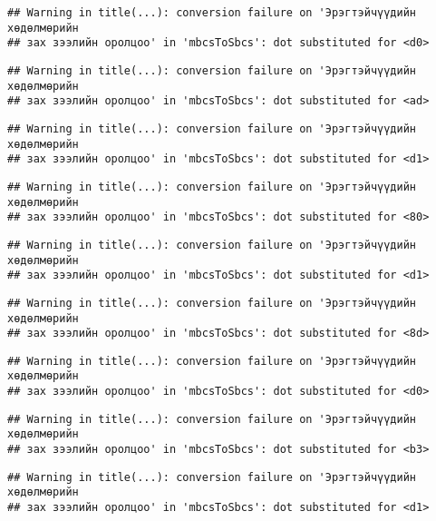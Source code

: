 \documentclass[]{article}
\begin{document}
\begin{verbatim}
## Warning in title(...): conversion failure on 'Эрэгтэйчүүдийн хөдөлмөрийн
## зах зээлийн оролцоо' in 'mbcsToSbcs': dot substituted for <d0>
\end{verbatim}

\begin{verbatim}
## Warning in title(...): conversion failure on 'Эрэгтэйчүүдийн хөдөлмөрийн
## зах зээлийн оролцоо' in 'mbcsToSbcs': dot substituted for <ad>
\end{verbatim}

\begin{verbatim}
## Warning in title(...): conversion failure on 'Эрэгтэйчүүдийн хөдөлмөрийн
## зах зээлийн оролцоо' in 'mbcsToSbcs': dot substituted for <d1>
\end{verbatim}

\begin{verbatim}
## Warning in title(...): conversion failure on 'Эрэгтэйчүүдийн хөдөлмөрийн
## зах зээлийн оролцоо' in 'mbcsToSbcs': dot substituted for <80>
\end{verbatim}

\begin{verbatim}
## Warning in title(...): conversion failure on 'Эрэгтэйчүүдийн хөдөлмөрийн
## зах зээлийн оролцоо' in 'mbcsToSbcs': dot substituted for <d1>
\end{verbatim}

\begin{verbatim}
## Warning in title(...): conversion failure on 'Эрэгтэйчүүдийн хөдөлмөрийн
## зах зээлийн оролцоо' in 'mbcsToSbcs': dot substituted for <8d>
\end{verbatim}

\begin{verbatim}
## Warning in title(...): conversion failure on 'Эрэгтэйчүүдийн хөдөлмөрийн
## зах зээлийн оролцоо' in 'mbcsToSbcs': dot substituted for <d0>
\end{verbatim}

\begin{verbatim}
## Warning in title(...): conversion failure on 'Эрэгтэйчүүдийн хөдөлмөрийн
## зах зээлийн оролцоо' in 'mbcsToSbcs': dot substituted for <b3>
\end{verbatim}

\begin{verbatim}
## Warning in title(...): conversion failure on 'Эрэгтэйчүүдийн хөдөлмөрийн
## зах зээлийн оролцоо' in 'mbcsToSbcs': dot substituted for <d1>
\end{verbatim}
\end{document}
